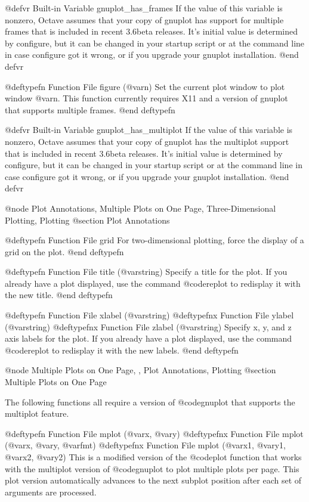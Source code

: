 @defvr {Built-in Variable} gnuplot_has_frames
If the value of this variable is nonzero, Octave assumes that your copy
of gnuplot has support for multiple frames that is included in recent
3.6beta releases.  It's initial value is determined by configure, but it
can be changed in your startup script or at the command line in case
configure got it wrong, or if you upgrade your gnuplot installation.
@end defvr

@deftypefn {Function File} {} figure (@var{n})
Set the current plot window to plot window @var{n}.  This function
currently requires X11 and a version of gnuplot that supports multiple
frames.
@end deftypefn

@defvr {Built-in Variable} gnuplot_has_multiplot
If the value of this variable is nonzero, Octave assumes that your copy
of gnuplot has the multiplot support that is included in recent
3.6beta releases.  It's initial value is determined by configure, but it
can be changed in your startup script or at the command line in case
configure got it wrong, or if you upgrade your gnuplot installation.
@end defvr

@node Plot Annotations, Multiple Plots on One Page, Three-Dimensional Plotting, Plotting
@section Plot Annotations

@deftypefn {Function File} {} grid
For two-dimensional plotting, force the display of a grid on the plot.
@end deftypefn

@deftypefn {Function File} {} title (@var{string})
Specify a title for the plot.  If you already have a plot displayed, use
the command @code{replot} to redisplay it with the new title.
@end deftypefn

@deftypefn {Function File} {} xlabel (@var{string})
@deftypefnx {Function File} {} ylabel (@var{string})
@deftypefnx {Function File} {} zlabel (@var{string})
Specify x, y, and z axis labels for the plot.  If you already have a plot
displayed, use the command @code{replot} to redisplay it with the new
labels.
@end deftypefn

@node Multiple Plots on One Page,  , Plot Annotations, Plotting
@section Multiple Plots on One Page

The following functions all require a version of @code{gnuplot} that
supports the multiplot feature.

@deftypefn {Function File} {} mplot (@var{x}, @var{y})
@deftypefnx {Function File} {} mplot (@var{x}, @var{y}, @var{fmt})
@deftypefnx {Function File} {} mplot (@var{x1}, @var{y1}, @var{x2}, @var{y2})
This is a modified version of the @code{plot} function that works with
the multiplot version of @code{gnuplot} to plot multiple plots per page. 
This plot version automatically advances to the next subplot position
after each set of arguments are processed.


